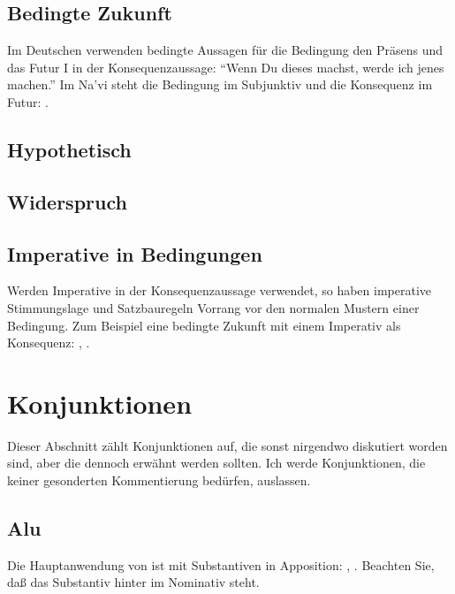 \subsection{Bedingte Zukunft} Im Deutschen verwenden bedingte Aussagen f\"ur die Bedingung
den Pr\"asens und das Futur I in der Konsequenzaussage: "`Wenn Du dieses machst, werde ich
jenes machen."' Im Na’vi steht die Bedingung im Subjunktiv und die Konsequenz im Futur:
 .

\subsection{Hypothetisch} 

\subsection{Widerspruch} 

\subsection{Imperative in Bedingungen} Werden Imperative in der Konsequenzaussage verwendet,
so haben imperative Stimmungslage und Satzbauregeln Vorrang vor den normalen Mustern einer
Bedingung. Zum Beispiel eine bedingte Zukunft mit einem Imperativ als Konsequenz:
,
.


\section{Konjunktionen}
\noindent Dieser Abschnitt z\"ahlt Konjunktionen auf, die sonst nirgendwo diskutiert worden
sind, aber die dennoch erw\"ahnt werden sollten. Ich werde Konjunktionen, die keiner
gesonderten Kommentierung bed\"urfen, auslassen.

\subsection{Alu} Die Hauptanwendung von  ist mit Substantiven in Apposition:
,
. Beachten Sie, da\ss{} das Substantiv
hinter  im Nominativ steht.
\label{syn:conj:alu}

